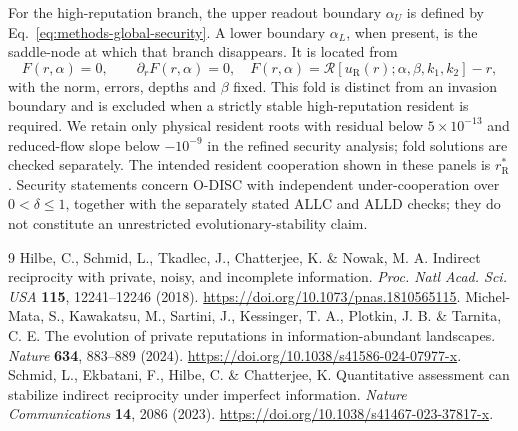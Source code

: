 \documentclass[fleqn,10pt]{article}
\begin{document}
For the high-reputation branch, the upper readout boundary $\alpha_U$ is defined by Eq.~\eqref{eq:methods-global-security}. A lower boundary $\alpha_L$, when present, is the saddle-node at which that branch disappears. It is located from
\begin{equation}
F(r,\alpha)=0,\qquad \partial_rF(r,\alpha)=0,
\quad F(r,\alpha)=\mathcal R[u_{\mathrm R}(r);\alpha,\beta,k_1,k_2]-r,
\label{eq:methods-resident-fold}
\end{equation}
with the norm, errors, depths and $\beta$ fixed. This fold is distinct from an invasion boundary and is excluded when a strictly stable high-reputation resident is required. We retain only physical resident roots with residual below $5\times10^{-13}$ and reduced-flow slope below $-10^{-9}$ in the refined security analysis; fold solutions are checked separately. The intended resident cooperation shown in these panels is $r_{\mathrm R}^*$. Security statements concern O-DISC with independent under-cooperation over $0<\delta\leq1$, together with the separately stated ALLC and ALLD checks; they do not constitute an unrestricted evolutionary-stability claim.

\begin{thebibliography}{9}
Hilbe, C., Schmid, L., Tkadlec, J., Chatterjee, K. \& Nowak, M. A.
Indirect reciprocity with private, noisy, and incomplete information.
\textit{Proc. Natl Acad. Sci. USA} \textbf{115}, 12241--12246 (2018).
\url{https://doi.org/10.1073/pnas.1810565115}.
Michel-Mata, S., Kawakatsu, M., Sartini, J., Kessinger, T. A., Plotkin, J. B. \& Tarnita, C. E.
The evolution of private reputations in information-abundant landscapes.
\textit{Nature} \textbf{634}, 883--889 (2024).
\url{https://doi.org/10.1038/s41586-024-07977-x}.
Schmid, L., Ekbatani, F., Hilbe, C. \& Chatterjee, K.
Quantitative assessment can stabilize indirect reciprocity under imperfect information.
\textit{Nature Communications} \textbf{14}, 2086 (2023).
\url{https://doi.org/10.1038/s41467-023-37817-x}.
\end{thebibliography}
\clearpage
\end{document}
